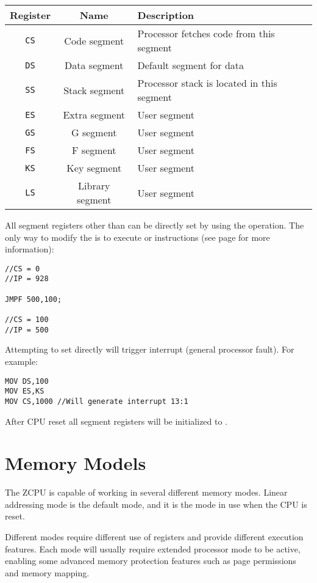 \singlespacing
\begin{longtable}{|c|c|p{3.0in}|} \hline
Register & Name & Description \\ \hline
\texttt{CS} & Code segment    & Processor fetches code from this segment \\ \hline
\texttt{DS} & Data segment    & Default segment for data \\ \hline
\texttt{SS} & Stack segment   & Processor stack is located in this segment \\ \hline
\texttt{ES} & Extra segment   & User segment \\ \hline
\texttt{GS} & G segment       & User segment \\ \hline
\texttt{FS} & F segment       & User segment \\ \hline
\texttt{KS} & Key segment     & User segment \\ \hline
\texttt{LS} & Library segment & User segment \\ \hline
\end{longtable}
\onehalfspacing

All segment registers other than  can be directly set by using the  operation. The only way to modify the  is to execute  or  instructions (see page \pageref{branching} for more information):
\begin{verbatim}
//CS = 0
//IP = 928

JMPF 500,100;

//CS = 100
//IP = 500
\end{verbatim}

Attempting to set  directly will trigger interrupt  (general processor fault). For example:
\begin{verbatim}
MOV DS,100
MOV ES,KS
MOV CS,1000 //Will generate interrupt 13:1
\end{verbatim}

After CPU reset all segment registers will be initialized to .

\section{Memory Models}
The ZCPU is capable of working in several different memory modes. Linear addressing mode is the default mode, and it is the mode in use when the CPU is reset.

Different modes require different use of registers and provide different execution features. Each mode will usually require extended processor mode to be active, enabling some advanced memory protection features such as page permissions and memory mapping.

